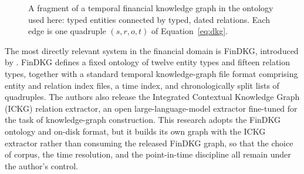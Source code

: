 \documentclass[a4paper,12pt]{report}
\begin{document}
\begin{figure}[ht]
\centering
{}
\caption{A fragment of a temporal financial knowledge graph in the
ontology used here: typed entities connected by typed, dated relations.
Each edge is one quadruple $(s, r, o, t)$ of
Equation~\ref{eq:dkg}.}
\label{fig:kgexample}
\end{figure}

The most directly relevant system in the financial domain is FinDKG, introduced
by \citet{Li2024FinDKG}. FinDKG defines a fixed ontology of twelve entity types
and fifteen relation types, together with a standard temporal knowledge-graph
file format comprising entity and relation index files, a time index, and
chronologically split lists of quadruples. The
authors also release the Integrated Contextual Knowledge Graph (ICKG) relation
extractor, an open large-language-model extractor fine-tuned for the task of
knowledge-graph construction. This research adopts the FinDKG ontology and
on-disk format, but it builds its own graph with the ICKG extractor rather than
consuming the released FinDKG graph, so that the choice of corpus, the time
resolution, and the point-in-time discipline all remain under the author's
control.
\end{document}
